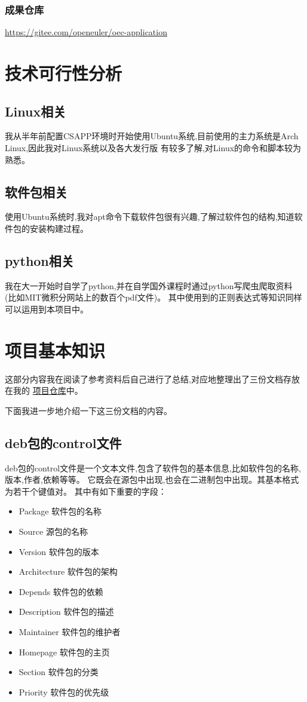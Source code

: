 \documentclass{article}
\begin{document}
\subsubsection{成果仓库}
\href{https://gitee.com/openeuler/oec-application}
{https://gitee.com/openeuler/oec-application}

\section{技术可行性分析}
\subsection{Linux相关}
我从半年前配置CSAPP环境时开始使用Ubuntu系统,目前使用的主力系统是Arch Linux,因此我对Linux系统以及各大发行版
有较多了解,对Linux的命令和脚本较为熟悉。

\subsection{软件包相关}
使用Ubuntu系统时,我对apt命令下载软件包很有兴趣,了解过软件包的结构,知道软件包的安装构建过程。

\subsection{python相关}
我在大一开始时自学了python,并在自学国外课程时通过python写爬虫爬取资料 (比如MIT微积分网站上的数百个pdf文件)。
其中使用到的正则表达式等知识同样可以运用到本项目中。

\section{项目基本知识}
\label{sec:basic_knowledge}
这部分内容我在阅读了参考资料后自己进行了总结,对应地整理出了三份文档存放在我的
\href{https://github.com/tinaaaaa42/deb2rpm}{项目仓库}中。

下面我进一步地介绍一下这三份文档的内容。

\subsection{deb包的control文件}
\label{sec:deb_control}
deb包的control文件是一个文本文件,包含了软件包的基本信息,比如软件包的名称,版本,作者,依赖等等。
它既会在源包中出现,也会在二进制包中出现。其基本格式为若干个键值对。
其中有如下重要的字段：

\begin{itemize}
    \item Package  软件包的名称
    \item Source   源包的名称
    \item Version  软件包的版本
    \item Architecture  软件包的架构
    \item Depends  软件包的依赖
    \item Description  软件包的描述
    \item Maintainer  软件包的维护者
    \item Homepage  软件包的主页
    \item Section  软件包的分类
    \item Priority  软件包的优先级
\end{itemize}
\end{document}
